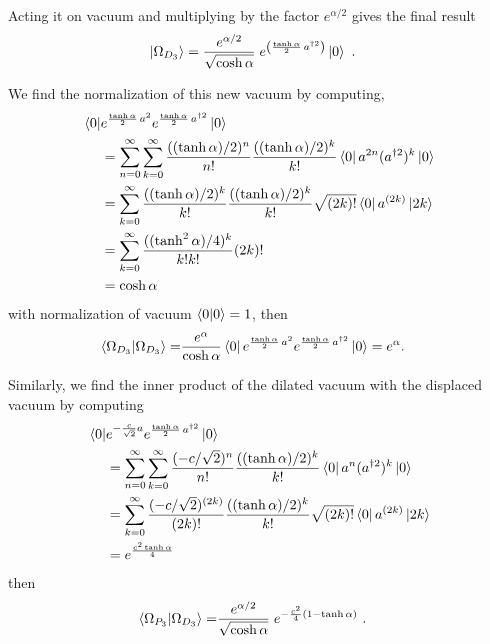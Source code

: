 \documentclass[%
 reprint,
superscriptaddress,
 amsmath,amssymb,
 aps,
]{revtex4-2}
\begin{document}
Acting it on vacuum and multiplying by the factor \(e^{\alpha/2}\) gives the final result
\begin{align}
    \ket{\Omega_{D_{3}}}&=\frac{e^{\alpha/2}}{\sqrt{\cosh\alpha}}\;
     e^{\left(\frac{\tanh\alpha}{2}\,a^{\dagger2}\right)}\ket{0}~.
\end{align}

We find the normalization of this new vacuum by computing,
\begin{align}
    \bra{0}&e^{\frac{\tanh\alpha}{2}\,a^{2}} e^{\frac{\tanh\alpha}{2}\,a^{\dagger2}}\ket{0}\nonumber\\
    &=\sum_{n=0}^{\infty}\sum_{k=0}^{\infty}\frac{((\tanh\alpha)/2)^n}{n!}\frac{((\tanh\alpha)/2)^k}{k!}\bra{0}a^{2n} (a^{\dagger2})^k\ket{0}\nonumber\\
    &=\sum_{k=0}^{\infty}\frac{((\tanh\alpha)/2)^k}{k!}\frac{((\tanh\alpha)/2)^k}{k!}\sqrt{(2k)!}\bra{0}a^{(2k)} \ket{2k}\nonumber\\
    &=\sum_{k=0}^{\infty}\frac{((\tanh^2{\alpha})/4)^k}{k!k!}(2k)!\nonumber\\
    &=\cosh{\alpha}
\end{align}
with normalization of vacuum $\braket{0|0}=1$, then
\begin{align}
    \braket{\Omega_{D_{3}}|\Omega_{D_{3}}} =&  \frac{e^{\alpha}}{\cosh\alpha}  \bra{0}e^{\frac{\tanh\alpha}{2}\,a^{2}} e^{\frac{\tanh\alpha}{2}\,a^{\dagger2}}\ket{0}=e^{\alpha}.
\end{align}

Similarly, we find the inner product of the dilated vacuum with
the displaced vacuum by computing
\begin{align}
    \bra{0}&e^{-\frac{c}{\sqrt{2}}a} e^{\frac{\tanh\alpha}{2}\,a^{\dagger2}}\ket{0}\nonumber\\
    &=\sum_{n=0}^{\infty}\sum_{k=0}^{\infty}\frac{(-c/\sqrt{2})^n}{n!}\frac{((\tanh\alpha)/2)^k}{k!}\bra{0}a^n (a^{\dagger2})^k\ket{0}\nonumber\\
    &=\sum_{k=0}^{\infty}\frac{(-c/\sqrt{2})^{(2k)}}{(2k)!}\frac{((\tanh\alpha)/2)^k}{k!}\sqrt{(2k)!}\bra{0}a^{(2k)} \ket{2k}\nonumber\\
    &=e^{\frac{c^2\tanh\alpha}{4}}
\end{align}
then
\begin{align}
    \braket{\Omega_{P_{3}}|\Omega_{D_{3}}} =& \frac{e^{\alpha/2}}{\sqrt{\cosh\alpha}}\; e^{-\frac{c^2}{4}(1-\tanh\alpha)}~.
\end{align}


\end{document}
